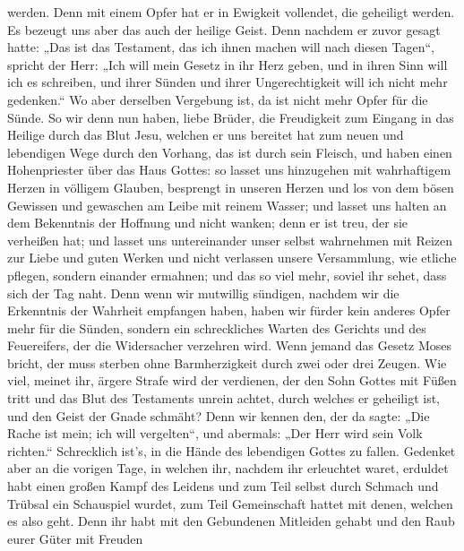 werden.  Denn mit einem Opfer hat er in Ewigkeit vollendet,
die geheiligt werden.  Es bezeugt uns aber das auch der
heilige Geist. Denn nachdem er zuvor gesagt hatte:  „Das
ist das Testament, das ich ihnen machen will nach diesen Tagen``,
spricht der Herr: „Ich will mein Gesetz in ihr Herz geben, und in ihren
Sinn will ich es schreiben,  und ihrer Sünden und ihrer
Ungerechtigkeit will ich nicht mehr gedenken.``  Wo aber
derselben Vergebung ist, da ist nicht mehr Opfer für die Sünde.
 So wir denn nun haben, liebe Brüder, die Freudigkeit zum
Eingang in das Heilige durch das Blut Jesu,  welchen er uns
bereitet hat zum neuen und lebendigen Wege durch den Vorhang, das ist
durch sein Fleisch,  und haben einen Hohenpriester über das
Haus Gottes:  so lasset uns hinzugehen mit wahrhaftigem
Herzen in völligem Glauben, besprengt in unseren Herzen und los von dem
bösen Gewissen und gewaschen am Leibe mit reinem Wasser; 
und lasset uns halten an dem Bekenntnis der Hoffnung und nicht wanken;
denn er ist treu, der sie verheißen hat;  und lasset uns
untereinander unser selbst wahrnehmen mit Reizen zur Liebe und guten
Werken  und nicht verlassen unsere Versammlung, wie etliche
pflegen, sondern einander ermahnen; und das so viel mehr, soviel ihr
sehet, dass sich der Tag naht.  Denn wenn wir mutwillig
sündigen, nachdem wir die Erkenntnis der Wahrheit empfangen haben, haben
wir fürder kein anderes Opfer mehr für die Sünden,  sondern
ein schreckliches Warten des Gerichts und des Feuereifers, der die
Widersacher verzehren wird.  Wenn jemand das Gesetz Moses
bricht, der muss sterben ohne Barmherzigkeit durch zwei oder drei
Zeugen.  Wie viel, meinet ihr, ärgere Strafe wird der
verdienen, der den Sohn Gottes mit Füßen tritt und das Blut des
Testaments unrein achtet, durch welches er geheiligt ist, und den Geist
der Gnade schmäht?  Denn wir kennen den, der da sagte: „Die
Rache ist mein; ich will vergelten``, und abermals: „Der Herr wird sein
Volk richten.``  Schrecklich ist's, in die Hände des
lebendigen Gottes zu fallen.  Gedenket aber an die vorigen
Tage, in welchen ihr, nachdem ihr erleuchtet waret, erduldet habt einen
großen Kampf des Leidens  und zum Teil selbst durch Schmach
und Trübsal ein Schauspiel wurdet, zum Teil Gemeinschaft hattet mit
denen, welchen es also geht.  Denn ihr habt mit den
Gebundenen Mitleiden gehabt und den Raub eurer Güter mit Freuden
